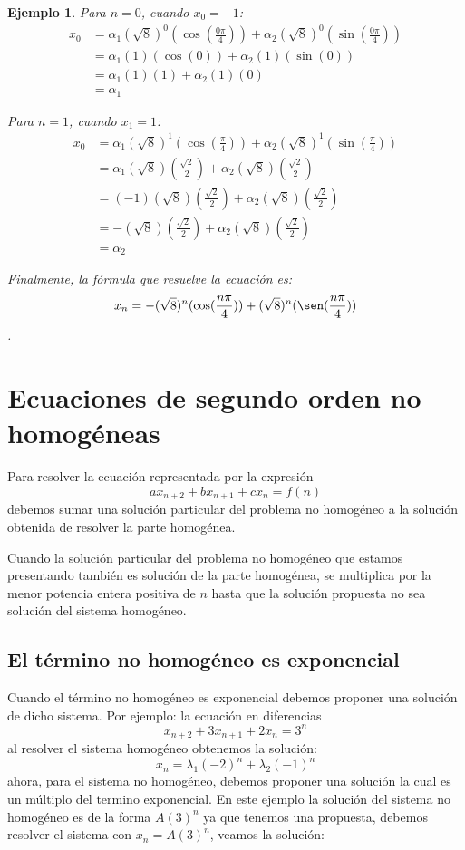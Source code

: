 \documentclass{report}
\newtheorem{ejemplo}{Ejemplo}
\begin{document}
\begin{ejemplo}
Para $n=0$, cuando $x_0=-1$:
\begin{align*}
  x_0&=\alpha_1(\sqrt{8})^0(\cos(\frac{0\pi}{4}))+\alpha_2(\sqrt{8})^0(\sin(\frac{0\pi}{4}))\\
  &=\alpha_1(1)(\cos(0))+\alpha_2(1)(\sin(0))\\
  &=\alpha_1(1)(1)+\alpha_2(1)(0)\\
  &=\alpha_1
\end{align*}

Para $n=1$, cuando $x_1=1$:
\begin{align*}
  x_0&=\alpha_1(\sqrt{8})^1(\cos(\frac{\pi}{4}))+\alpha_2(\sqrt{8})^1(\sin(\frac{\pi}{4}))\\
  &=\alpha_1(\sqrt{8})(\frac{\sqrt{2}}{2})+\alpha_2(\sqrt{8})(\frac{\sqrt{2}}{2})\\
  &=(-1)(\sqrt{8})(\frac{\sqrt{2}}{2})+\alpha_2(\sqrt{8})(\frac{\sqrt{2}}{2})\\
  &=-(\sqrt{8})(\frac{\sqrt{2}}{2})+\alpha_2(\sqrt{8})(\frac{\sqrt{2}}{2})\\
  &=\alpha_2
\end{align*}

Finalmente, la fórmula que resuelve la ecuación es:
$$x_n=-(\sqrt{8})^n(\cos(\frac{n\pi}{4}))+(\sqrt{8})^n(\sen(\frac{n\pi}{4}))$$.
\end{ejemplo}

\section{Ecuaciones de segundo orden no homogéneas}
\label{sec:nohomogeneas}

Para resolver la ecuación representada por la expresión
$$ax_{n+2}+bx_{n+1}+cx_{n}=f(n)$$
debemos sumar una solución particular del problema no homogéneo a la
solución obtenida de resolver la parte homogénea.

Cuando la solución particular del problema no homogéneo que estamos
presentando también es solución de la parte homogénea, se multiplica
por la menor potencia entera positiva de $n$ hasta que la solución
propuesta no sea solución del sistema homogéneo.

\subsection{El término no homogéneo es exponencial}
\label{sec:exponencial}

Cuando el término no homogéneo es exponencial debemos proponer una
solución de dicho sistema. Por ejemplo: la ecuación en diferencias
$$x_{n+2}+3x_{n+1}+2x_n=3^n$$
al resolver el sistema homogéneo obtenemos la solución:
$$x_n=\lambda_1(-2)^n+\lambda_2(-1)^n$$
ahora, para el sistema no homogéneo, debemos proponer una solución la
cual es un múltiplo del termino exponencial. En este ejemplo la
solución del sistema no homogéneo es de la forma $A(3)^n$ ya que
tenemos una propuesta, debemos resolver el sistema con $x_n=A(3)^n$,
veamos la solución:
\end{document}
